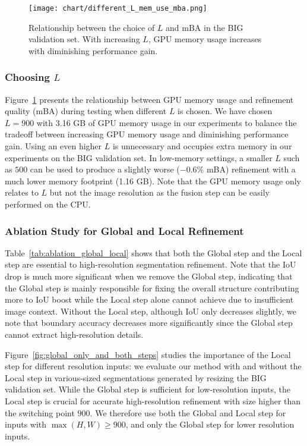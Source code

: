 \documentclass[10pt,twocolumn,letterpaper]{article}
\begin{document}
\begin{figure}[h]
\centering
	\texttt{[image: chart/different\_L\_mem\_use\_mba.png]}
	\caption{Relationship between the choice of $L$ and mBA in the BIG validation set. With increasing $L$, GPU memory usage increases with diminishing performance gain. }
	\label{fig:mem_iou}
	\vspace{-0.15in}
\end{figure}

\subsubsection{Choosing $L$} 
Figure~\ref{fig:mem_iou} presents the relationship between GPU memory usage and refinement quality (mBA) during testing when different $L$ is chosen. We have chosen $L=900$ with 3.16 GB of GPU memory usage in our experiments to balance the tradeoff between increasing GPU memory usage and diminishing performance gain.
Using an even higher $L$ is unnecessary and occupies extra memory in our experiments on the BIG validation set. 
In low-memory settings, a smaller $L$ such as $500$ can be used to produce a slightly worse ($-0.6$\% mBA) refinement with a much lower memory footprint (1.16 GB). Note that the GPU memory usage only relates to $L$ but not the image resolution as the fusion step can be easily performed on the CPU.

\subsubsection{Ablation Study for Global and Local Refinement}
Table~\ref{tab:ablation_global_local} shows that both the Global step and the Local step are essential to high-resolution segmentation refinement. 
Note that the IoU drop is much more significant when we remove the Global step, indicating that the Global step is mainly responsible for fixing the overall structure contributing more to IoU boost while the Local step alone cannot achieve due to insufficient image context. Without the Local step, although IoU only decreases slightly, we note that boundary accuracy decreases more significantly since the Global step cannot extract high-resolution details.

Figure~\ref{fig:global_only_and_both_steps} studies the importance of the Local step for different resolution inputs: we evaluate our method with and without the Local step in various-sized segmentations generated by resizing the BIG validation set.
While the Global step is sufficient for low-resolution inputs, the Local step is crucial for accurate high-resolution refinement with size higher than the switching point $900$.
We therefore use both the Global and Local step for inputs with $\max(H, W)\geq 900$, and only the Global step for lower resolution inputs.
\end{document}
